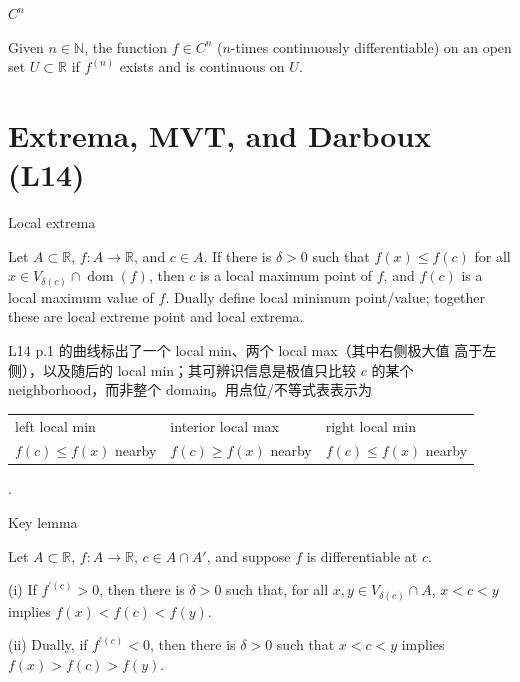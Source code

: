 \begin{definition}{\(C^{n}\)}

Given \(n \in \mathbb{N}\), the function \(f \in C^{n}\) (\(n\)-times continuously differentiable) on an open set \(U \subset \mathbb{R}\) if \(f^{(n)}\) exists and is continuous on \(U\).

\end{definition}

\section{Extrema, MVT, and Darboux (L14)}

\begin{definition}{Local extrema}

Let \(A \subset \mathbb{R}\), \(f:A\rightarrow\mathbb{R}\), and \(c \in A\). If there is \(\delta > 0\) such that \(f(x) \leq f(c)\) for all \(x \in V_{\delta{(c)}} \cap \operatorname{dom}(f)\), then \(c\) is a local maximum point of \(f\), and \(f(c)\) is a local maximum value of \(f\). Dually define local minimum point/value; together these are local extreme point and local extrema.

L14 p.1 的曲线标出了一个 local min、两个 local max（其中右侧极大值 高于左侧），以及随后的 local min；其可辨识信息是极值只比较 \(c\) 的某个 neighborhood，而非整个 domain。用点位/不等式表表示为

{\def\LTcaptype{none} %
\begin{longtable}[]{@{}lll@{}}
\toprule\noalign{}
\endhead
\bottomrule\noalign{}
\endlastfoot
left local min & interior local max & right local min \\
\(f(c) \leq f(x)\) nearby & \(f(c) \geq f(x)\) nearby & \(f(c) \leq f(x)\) nearby \\
\end{longtable}
}

.

\end{definition}

\begin{lemma}{Key lemma}

Let \(A \subset \mathbb{R}\), \(f:A\rightarrow\mathbb{R}\), \(c \in A \cap A'\), and suppose \(f\) is differentiable at \(c\).

(i) If \(f^{'{(c)}} > 0\), then there is \(\delta > 0\) such that, for all \(x,y \in V_{\delta{(c)}} \cap A\), \(x < c < y\) implies \(f(x) < f(c) < f(y)\).

(ii) Dually, if \(f^{'{(c)}} < 0\), then there is \(\delta > 0\) such that \(x < c < y\) implies \(f(x) > f(c) > f(y)\).

\end{lemma}

